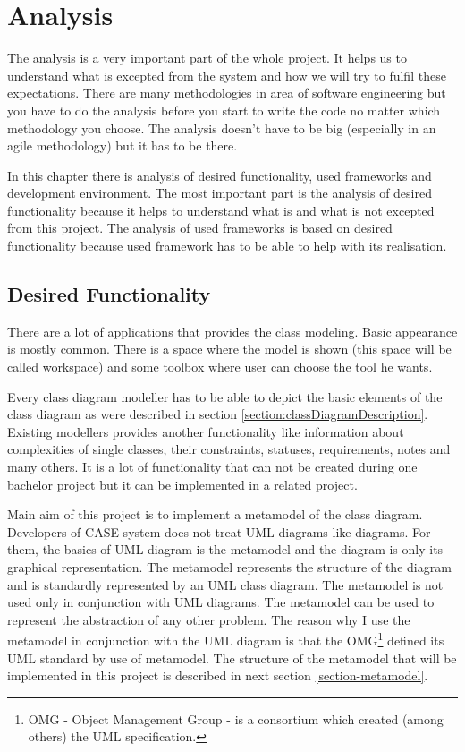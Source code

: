 \chapter{Analysis}

The analysis is a very important part of the whole project. It helps us to understand what is excepted from the system and how we will try to fulfil these expectations. There are many methodologies in area of software engineering but you have to do the analysis before you start to write the code no matter which methodology you choose. The analysis doesn't have to be big (especially in an agile methodology) but it has to be there.

In this chapter there is analysis of desired functionality, used frameworks and development environment. The most important part is the analysis of desired functionality because it helps to understand what is and what is not excepted from this project. The analysis of used frameworks is based on desired functionality because used framework has to be able to help with its realisation.

\section{Desired Functionality}

There are a lot of applications that provides the class modeling. Basic appearance is mostly common. There is a space where the model is shown (this space will be called workspace) and some toolbox where user can choose the tool he wants.

Every class diagram modeller has to be able to depict the basic elements of the class diagram as were described in section \ref{section:classDiagramDescription}. Existing modellers provides another functionality like information about complexities of single classes, their constraints, statuses, requirements, notes and many others. It is a lot of functionality that can not be created during one bachelor project but it can be implemented in a related project.

Main aim of this project is to implement a metamodel of the class diagram. Developers of CASE system does not treat UML diagrams like diagrams. For them, the basics of UML diagram is the metamodel and the diagram is only its graphical representation. The metamodel represents the structure of the diagram and is standardly represented by an UML class diagram. The metamodel is not used only in conjunction with UML diagrams. The metamodel can be used to represent the abstraction of any other problem. The reason why I use the metamodel in conjunction with the UML diagram is that the OMG\footnote{OMG - Object Management Group - is a consortium which created (among others) the UML specification.} defined its UML standard by use of metamodel. The structure of the metamodel that will be implemented in this project is described in next section \ref{section-metamodel}.

